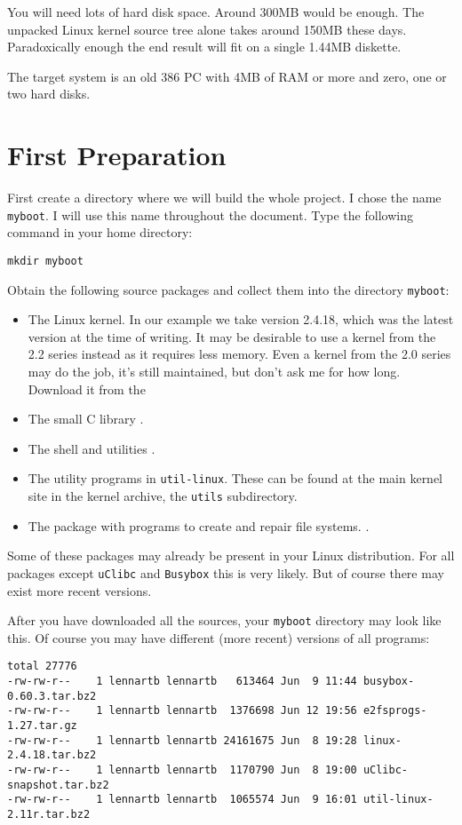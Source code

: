 \documentclass[12pt,a4paper]{article}
\begin{document}
You will need lots of hard disk space. Around 300MB would be
enough. The unpacked Linux kernel source tree alone takes around 150MB
these days. Paradoxically enough the end result will fit on a single
1.44MB diskette.

The target system is an old 386 PC with 4MB of RAM or more and zero,
one or two hard disks.

\section{First Preparation}

First create a directory where we will build the whole project. I
chose the name {\tt myboot}. I will use this name throughout the
document. Type the following command in your home directory:
\begin{verbatim}
mkdir myboot
\end{verbatim}

Obtain the following source packages and collect them into the
directory {\tt myboot}:
\begin{itemize}
\item The Linux kernel. In our example we take version 2.4.18, which
  was the latest version at the time of writing. It may be desirable
  to use a kernel from the 2.2 series instead as it requires less
  memory. Even a kernel from the 2.0 series may do the job, it's still
  maintained, but don't ask me for how long. Download it from the
\item The small C library 
  .
\item The shell and utilities 
  .
\item The utility programs in {\tt util-linux}. These can be found at
  the main kernel site in the kernel archive, the {\tt utils} 
  subdirectory.
\item The package  with programs to create
  and repair file systems. .
\end{itemize}

Some of these packages may already be present in your Linux
distribution. For all packages except {\tt uClibc} and {\tt Busybox}
this is very likely. But of course there may exist more recent
versions.

After you have downloaded all the sources, your {\tt myboot} directory
may look like this. Of course you may have different (more recent)
versions of all programs:
{\scriptsize
\begin{verbatim}
total 27776
-rw-rw-r--    1 lennartb lennartb   613464 Jun  9 11:44 busybox-0.60.3.tar.bz2
-rw-rw-r--    1 lennartb lennartb  1376698 Jun 12 19:56 e2fsprogs-1.27.tar.gz
-rw-rw-r--    1 lennartb lennartb 24161675 Jun  8 19:28 linux-2.4.18.tar.bz2
-rw-rw-r--    1 lennartb lennartb  1170790 Jun  8 19:00 uClibc-snapshot.tar.bz2
-rw-rw-r--    1 lennartb lennartb  1065574 Jun  9 16:01 util-linux-2.11r.tar.bz2
\end{verbatim}
}
\end{document}
